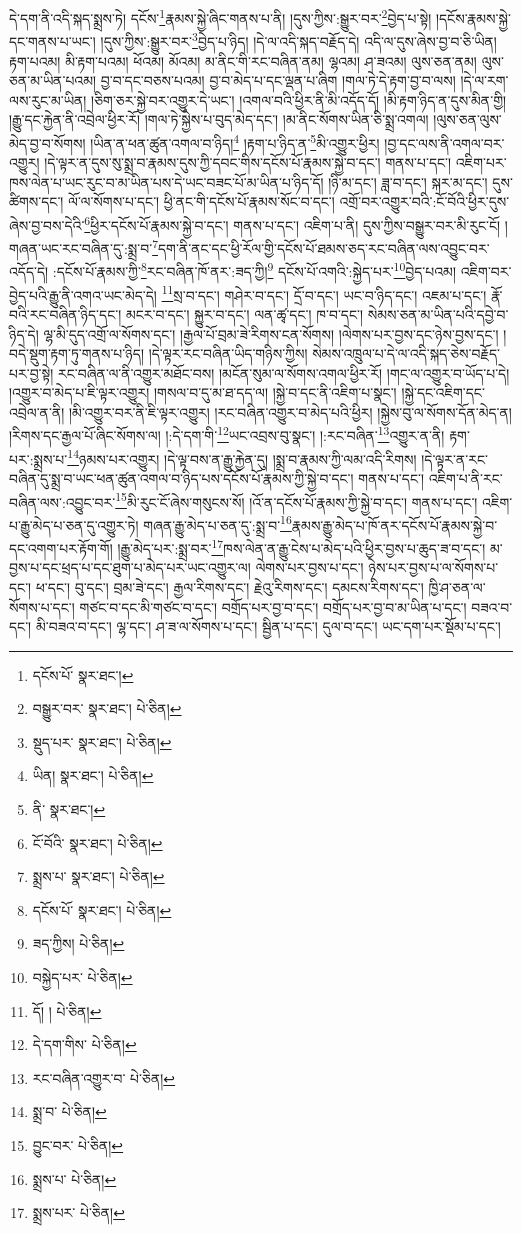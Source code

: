 དེ་དག་ནི་འདི་སྐད་སྨྲས་ཏེ། དངོས་\footnote{དངོས་པོ་  སྣར་ཐང་། }རྣམས་སྐྱེ་ཞིང་གནས་པ་ནི། །དུས་ཀྱིས་:སྒྱུར་བར་\footnote{བསྒྱུར་བར་  སྣར་ཐང་།  པེ་ཅིན། }བྱེད་པ་སྟེ། །དངོས་རྣམས་སྐྱེ་དང་གནས་པ་ཡང་། །དུས་ཀྱིས་:སྒྱུར་བར་\footnote{སྡུད་པར་  སྣར་ཐང་།  པེ་ཅིན། }བྱེད་པ་ཉིད། །དེ་ལ་འདི་སྐད་བརྗོད་དེ། འདི་ལ་དུས་ཞེས་བྱ་བ་ཅི་ཡིན། རྟག་པའམ། མི་རྟག་པའམ། ཕོའམ། མོའམ། མ་ནིང་གི་རང་བཞིན་ནམ། ལྷའམ། ཤ་ཟའམ། ལུས་ཅན་ནམ། ལུས་ཅན་མ་ཡིན་པའམ། བྱ་བ་དང་བཅས་པའམ། བྱ་བ་མེད་པ་དང་ལྡན་པ་ཞིག །གལ་ཏེ་དེ་རྟག་བྱ་བ་ལས། །དེ་ལ་རག་ལས་རུང་མ་ཡིན། །ཅིག་ཅར་སྐྱེ་བར་འགྱུར་དེ་ཡང་། །འགལ་བའི་ཕྱིར་ནི་མི་འདོད་དོ། །མི་རྟག་ཉིད་ན་དུས་མིན་གྱི། །རྒྱུ་དང་རྐྱེན་ནི་འབྲེལ་ཕྱིར་རོ། །གལ་ཏེ་སྐྱེས་པ་བུད་མེད་དང་། །མ་ནིང་སོགས་ཡིན་ཅི་སྨྲ་འགལ། །ལུས་ཅན་ལུས་མེད་བྱ་བ་སོགས། །ཡིན་ན་ཕན་ཚུན་འགལ་བ་ཉིད།\footnote{ཡིན།  སྣར་ཐང་།  པེ་ཅིན། } །རྟག་པ་ཉིད་ན་\footnote{ནི་  སྣར་ཐང་། }མི་འགྱུར་ཕྱིར། །བྱ་དང་ལས་ནི་འགལ་བར་འགྱུར། །དེ་ལྟར་ན་དུས་སུ་སྨྲ་བ་རྣམས་དུས་ཀྱི་དབང་གིས་དངོས་པོ་རྣམས་སྐྱེ་བ་དང་། གནས་པ་དང་། འཇིག་པར་ཁས་ལེན་པ་ཡང་རུང་བ་མ་ཡིན་པས་དེ་ཡང་བཟང་པོ་མ་ཡིན་པ་ཉིད་དོ། །ཉི་མ་དང་། ཟླ་བ་དང་། སྐར་མ་དང་། དུས་ཚིགས་དང་། ལོ་ལ་སོགས་པ་དང་། ཕྱི་ནང་གི་དངོས་པོ་རྣམས་སོང་བ་དང་། འགྲོ་བར་འགྱུར་བའི་:ངོ་བོའི་ཕྱིར་དུས་ཞེས་བྱ་བས་དེའི་\footnote{ངོ་བོའི་  སྣར་ཐང་།  པེ་ཅིན། }ཕྱིར་དངོས་པོ་རྣམས་སྐྱེ་བ་དང་། གནས་པ་དང་། འཇིག་པ་ནི། དུས་ཀྱིས་བསྒྱུར་བར་མི་རུང་ངོ། །གཞན་ཡང་རང་བཞིན་དུ་:སྨྲ་བ་\footnote{སྨྲས་པ་  སྣར་ཐང་།  པེ་ཅིན། }དག་ནི་ནང་དང་ཕྱི་རོལ་གྱི་དངོས་པོ་ཐམས་ཅད་རང་བཞིན་ལས་འབྱུང་བར་འདོད་དེ། :དངོས་པོ་རྣམས་ཀྱི་\footnote{དངོས་པོ་  སྣར་ཐང་།  པེ་ཅིན། }རང་བཞིན་ཁོ་ནར་:ཟད་ཀྱི།\footnote{ཟད་ཀྱིས།  པེ་ཅིན། } དངོས་པོ་འགའི་:སྐྱེད་པར་\footnote{བསྐྱེད་པར་  པེ་ཅིན། }བྱེད་པའམ། འཇིག་བར་བྱེད་པའི་རྒྱུ་ནི་འགའ་ཡང་མེད་དེ། \footnote{དོ། །   པེ་ཅིན། }སྲ་བ་དང་། གཤེར་བ་དང་། དྲོ་བ་དང་། ཡང་བ་ཉིད་དང་། འཇམ་པ་དང་། རྣོ་བའི་རང་བཞིན་ཉིད་དང་། མངར་བ་དང་། སྐྱུར་བ་དང་། ལན་ཚྭ་དང་། ཁ་བ་དང་། སེམས་ཅན་མ་ཡིན་པའི་དབྱེ་བ་ཉིད་དེ། ལྷ་མི་དུད་འགྲོ་ལ་སོགས་དང་། །རྒྱལ་པོ་བྲམ་ཟེ་རིགས་ངན་སོགས། །ལེགས་པར་བྱས་དང་ཉེས་བྱས་དང་། །བདེ་སྡུག་རྟག་ཏུ་གནས་པ་ཉིད། །དེ་ལྟར་རང་བཞིན་ཡིད་གཉིས་ཀྱིས། སེམས་འཁྲུལ་པ་དེ་ལ་འདི་སྐད་ཅེས་བརྗོད་པར་བྱ་སྟེ། རང་བཞིན་ལ་ནི་འགྱུར་མཐོང་བས། །མངོན་སུམ་ལ་སོགས་འགལ་ཕྱིར་རོ། །གང་ལ་འགྱུར་བ་ཡོད་པ་དེ། །འགྱུར་བ་མེད་པ་ཇི་ལྟར་འགྱུར། །གསལ་བ་དུ་མ་ཐ་དད་ལ། །སྐྱེ་བ་དང་ནི་འཇིག་པ་སྣང་། །སྐྱེ་དང་འཇིག་དང་འབྲེལ་ན་ནི། །མི་འགྱུར་བར་ནི་ཇི་ལྟར་འགྱུར། །རང་བཞིན་འགྱུར་བ་མེད་པའི་ཕྱིར། །སྐྱེས་བུ་ལ་སོགས་དོན་མེད་ན། །རིགས་དང་རྒྱལ་པོ་ཞིང་སོགས་ལ། །:དེ་དག་གི་\footnote{དེ་དག་གིས་  པེ་ཅིན། }ཡང་འབྲས་བུ་སྣང་། །:རང་བཞིན་\footnote{རང་བཞིན་འགྱུར་བ་  པེ་ཅིན། }འགྱུར་ན་ནི། རྟག་པར་:སྨྲས་པ་\footnote{སྨྲ་བ་  པེ་ཅིན། }ཉམས་པར་འགྱུར། །དེ་ལྟ་བས་ན་རྒྱུ་རྐྱེན་དུ། །སྨྲ་བ་རྣམས་ཀྱི་ལམ་འདི་རིགས། །དེ་ལྟར་ན་རང་བཞིན་དུ་སྨྲ་བ་ཡང་ཕན་ཚུན་འགལ་བ་ཉིད་པས་དངོས་པོ་རྣམས་ཀྱི་སྐྱེ་བ་དང་། གནས་པ་དང་། འཇིག་པ་ནི་རང་བཞིན་ལས་:འབྱུང་བར་\footnote{བྱུང་བར་  པེ་ཅིན། }མི་རུང་ངོ་ཞེས་གསུངས་སོ། །འོ་ན་དངོས་པོ་རྣམས་ཀྱི་སྐྱེ་བ་དང་། གནས་པ་དང་། འཇིག་པ་རྒྱུ་མེད་པ་ཅན་དུ་འགྱུར་ཏེ། གཞན་རྒྱུ་མེད་པ་ཅན་དུ་:སྨྲ་བ་\footnote{སྨྲས་པ་  པེ་ཅིན། }རྣམས་རྒྱུ་མེད་པ་ཁོ་ནར་དངོས་པོ་རྣམས་སྐྱེ་བ་དང་འགག་པར་རྟོག་གོ། །རྒྱུ་མེད་པར་:སྨྲ་བར་\footnote{སྨྲས་པར་  པེ་ཅིན། }ཁས་ལེན་ན་རྒྱུ་ངེས་པ་མེད་པའི་ཕྱིར་བྱས་པ་ཆུད་ཟ་བ་དང་། མ་བྱས་པ་དང་ཕྲད་པ་དང་ཐུག་པ་མེད་པར་ཡང་འགྱུར་ལ། ལེགས་པར་བྱས་པ་དང་། ཉེས་པར་བྱས་པ་ལ་སོགས་པ་དང་། ཕ་དང་། བུ་དང་། བྲམ་ཟེ་དང་། རྒྱལ་རིགས་དང་། རྗེའུ་རིགས་དང་། དམངས་རིགས་དང་། ཁྱི་ཤ་ཅན་ལ་སོགས་པ་དང་། གཙང་བ་དང་མི་གཙང་བ་དང་། བགྲོད་པར་བྱ་བ་དང་། བགྲོད་པར་བྱ་བ་མ་ཡིན་པ་དང་། བཟའ་བ་དང་། མི་བཟའ་བ་དང་། ལྷ་དང་། ཤ་ཟ་ལ་སོགས་པ་དང་། སྦྱིན་པ་དང་། དུལ་བ་དང་། ཡང་དག་པར་སྡོམ་པ་དང་། 